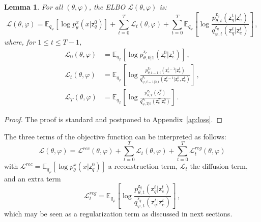 \documentclass[nolayout]{article}
\theoremstyle{plain}
\newtheorem{lemma}[theorem]{Lemma}
\theoremstyle{definition}
\theoremstyle{remark}
\newcommand{\latentcont}{\mathsf{z}_e}
\newcommand{\latentdis}{\mathsf{z}_q}
\begin{document}
\begin{lemma}
\label{lem:loss}
For all $(\theta,\varphi)$, the ELBO $\mathcal{L}(\theta,\varphi)$ is:
$$
\mathcal{L}(\theta,\varphi) = \mathbb{E}_{q_{\varphi}}\left[\log p^x_{\theta}(x|\latentdis^{0})\right] + \sum_{t=0}^T \mathcal{L}_t(\theta,\varphi)+ \sum_{t=0}^T\mathbb{E}_{q_{\varphi}}\left[\log \frac{p_{\theta,t}^{\latentdis}(\latentdis^{t}|\latentcont^{t})}{q_{\varphi,t}^{\latentdis}(\latentdis^{t}|\latentcont^{t})}\right]\,, 
$$
where, for $1\leqslant t \leqslant T-1$,
\begin{align*}
\mathcal{L}_0(\theta,\varphi) &=  \mathbb{E}_{q_\varphi}\left[\log p^{\latentcont}_{\theta, 0|1}(\latentcont^0|\latentcont^{1})\right]\,,\\
\mathcal{L}_t(\theta,\varphi) &= \mathbb{E}_{q_{\varphi}}\left[\log \frac{p_{\theta,t-1|t}^{\latentcont}(\latentcont^{t-1}|\latentcont^{t})}{q^{\latentcont}_{\varphi,t-1|0,t}(\latentcont^{t-1}|\latentcont^{0},\latentcont^{t})}\right]\,,\\
    \mathcal{L}_T(\theta,\varphi) &= \mathbb{E}_{q_{\varphi}}\left[\log \frac{p^{\latentcont}_{\theta,T}(\latentcont^{T})}{q_{\varphi,T|0}^{\latentcont}(\latentcont^{T}|\latentcont^{0})}\right]\,.
\end{align*}
\end{lemma}
\begin{proof}
The proof is standard and postponed to Appendix~\ref{ap:loss}.
\end{proof}
The three terms of the objective function can be interpreted as follows:
$$
\mathcal{L}(\theta,\varphi) = \mathcal{L}^{rec}(\theta,\varphi) + \sum_{t=0}^T \mathcal{L}_t(\theta,\varphi) + \sum_{t=0}^T \mathcal{L}^{reg}_t(\theta,\varphi)
$$
with $\mathcal{L}^{rec} = \mathbb{E}_{q_{\varphi}}[\log p^x_{\theta}(x|\latentdis^{0})]$ a reconstruction term, $\mathcal{L}_t$ the diffusion term, and an extra term \begin{equation}
\mathcal{L}^{reg}_t = \mathbb{E}_{q_{\varphi}}\left[\log \frac{p_{\theta,t}^{\latentdis}(\latentdis^{t}|\latentcont^{t})}{q_{\varphi,t}^{\latentdis}(\latentdis^{t}|\latentcont^{t})}\right]\,,
\end{equation}
which may be seen as a regularization term as discussed in next sections.
\end{document}
